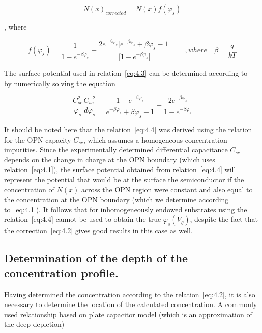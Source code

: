 \begin{equation}\label{eq:4.2}
  {N(x)}_{corrected} = N(x)f(\varphi_{s})
\end{equation}

, where

\begin{equation}\label{eq:4.3}
  f(\varphi_{s}) = {\frac{1}{1-e^{-\beta\varphi_{s}}}} - {\frac{2e^{-\beta\varphi_{s}}\big[e^{-\beta\varphi_{s}}+\beta\varphi_{s} -1\big]}{\big[1-e^{-\beta\varphi_{s}}\big]}} \qquad, where\quad \beta=\frac{q}{kT}
\end{equation}

The surface potential used in relation~\ref{eq:4.3} can be determined
according to~\cite{4.7} by numerically solving the equation

\begin{equation}\label{eq:4.4}
  \frac{C_{sc}^{2}}{\varphi_{s}}\frac{C_{sc}^{-2}}{d\varphi_{s}}=\frac{1-e^{-\beta\varphi_{s}}}{e^{-\beta\varphi_{s}}+\beta\varphi_{s}-1}-\frac{2e^{-\beta\varphi_{s}}} {1-e^{-\beta\varphi_{s}}}
\end{equation}

It should be noted here that the relation~\ref{eq:4.4} was derived
using the relation for the OPN capacity $C_{sc}$, which assumes a
homogeneous concentration impurities. Since the experimentally
determined differential capacitance $C_{sc}$ depends on the change in
charge at the OPN boundary (which uses relation~\ref{eq:4.1}), the
surface potential obtained from relation~\ref{eq:4.4} will represent
the potential that would be at the surface the semiconductor if the
concentration of $N(x)$ across the OPN region were constant and also
equal to the concentration at the OPN boundary (which we determine
according to~\ref{eq:4.1}). It follows that for inhomogeneously
endowed substrates using the relation~\ref{eq:4.4} cannot be used to
obtain the true $\varphi_{s}(V_{g})$, despite the fact that the
correction~\ref{eq:4.2} gives good results in this case as well.

\subsection[Determination of the depth of the concentration profile.]{Determination of the depth of the concentration profile.}\label{sec:4.1.2}

Having determined the concentration according to the
relation~\ref{eq:4.2}, it is also necessary to determine the location
of the calculated concentration. A commonly used relationship based on
plate capacitor model (which is an approximation of the deep
depletion)

